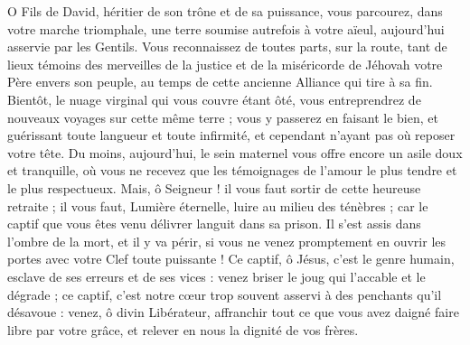 \documentclass[%
fontsize=10%
,a6paper%
,DIV=15%
]{scrartcl}
\begin{document}

O Fils de David, héritier de son trône et de sa puissance, vous parcourez, dans votre marche triomphale, une terre soumise autrefois à votre aïeul, aujourd’hui asservie par les Gentils. Vous reconnaissez de toutes parts, sur la route, tant de lieux témoins des merveilles de la justice et de la miséricorde de Jéhovah votre Père envers son peuple, au temps de cette ancienne Alliance qui tire à sa fin. Bientôt, le nuage virginal qui vous couvre étant ôté, vous entreprendrez de nouveaux voyages sur cette même terre ; vous y passerez en faisant le bien, et guérissant toute langueur et toute infirmité, et cependant n’ayant pas où reposer votre tête. Du moins, aujourd’hui, le sein maternel vous offre encore un asile doux et tranquille, où vous ne recevez que les témoignages de l’amour le plus tendre et le plus respectueux. Mais, ô Seigneur ! il vous faut sortir de cette heureuse retraite ; il vous faut, Lumière éternelle, luire au milieu des ténèbres ; car le captif que vous êtes venu délivrer languit dans sa prison. Il s’est assis dans l’ombre de la mort, et il y va périr, si vous ne venez promptement en ouvrir les portes avec votre Clef toute puissante ! Ce captif, ô Jésus, c’est le genre humain, esclave de ses erreurs et de ses vices : venez briser le joug qui l’accable et le dégrade ; ce captif, c’est notre cœur trop souvent asservi à des penchants qu’il désavoue : venez, ô divin Libérateur, affranchir tout ce que vous avez daigné faire libre par votre grâce, et relever en nous la dignité de vos frères.

\end{document}
